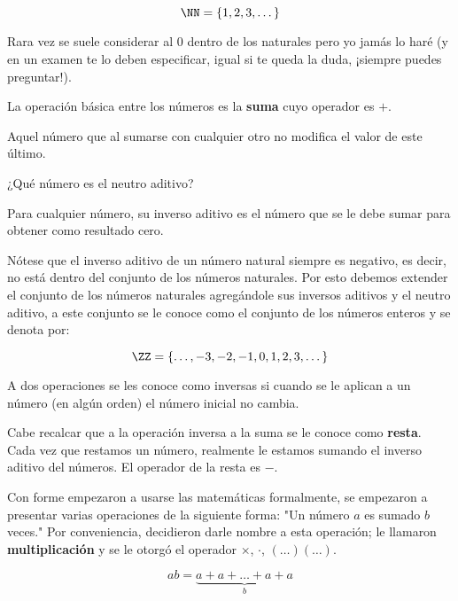 \[\NN = \{1, 2, 3, \dots\}\]

Rara vez se suele considerar al $0$ dentro de los naturales 
pero yo jamás lo haré (y en un examen te lo deben especificar, 
igual si te queda la duda, ¡siempre puedes preguntar!).

La operación básica entre los números es la \textbf{suma} 
cuyo operador es $+$.

\begin{definition}
    Aquel número que al sumarse con cualquier otro no modifica 
    el valor de este último.
\end{definition}

\begin{question}
    ¿Qué número es el neutro aditivo?
\end{question}

\begin{definition}
    Para cualquier número, su inverso aditivo es el 
    número que se le debe sumar para obtener como resultado 
    cero.
\end{definition}

Nótese que el inverso aditivo de un número natural siempre es 
negativo, es decir, no está dentro del conjunto de los números 
naturales. Por esto debemos extender el conjunto de los 
números naturales agregándole sus inversos aditivos 
y el neutro aditivo, a este conjunto se le conoce como el conjunto 
de los números enteros y se denota por:

\[\ZZ = \{\dots, -3, -2, -1, 0, 1, 2, 3, \dots\}\]

\begin{definition}
    A dos operaciones se les conoce como inversas 
    si cuando se le aplican a un número 
    (en algún orden) el número inicial no cambia.
\end{definition}

Cabe recalcar que a la operación inversa a la suma se le conoce 
como \textbf{resta}. Cada vez que restamos un número, realmente le 
estamos sumando el inverso aditivo del números. El operador 
de la resta es $-$.

Con forme empezaron a usarse las matemáticas formalmente, 
se empezaron a presentar varias operaciones de la siguiente forma: 
"Un número $a$ es sumado $b$ veces." Por conveniencia, 
decidieron darle nombre a esta operación; le llamaron 
\textbf{multiplicación} y se le otorgó el operador 
$\times$, $\cdot$, $(\dots)(\dots)$.

\[ab=\underbrace{a+a+\dots+a+a}_{b}\]

